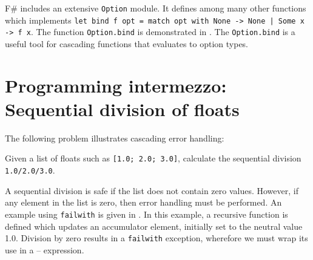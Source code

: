 F\# includes an extensive \lstinline{Option} module. It defines among many other functions  which implements \lstinline{let bind f opt = match opt with None -> None | Some x -> f x}. The function \lstinline{Option.bind} is demonstrated in .
%
%
The \lstinline{Option.bind} is a useful tool for cascading functions that evaluates to option types.

\section{Programming intermezzo: Sequential division of floats}
The following problem illustrates cascading error handling:
\begin{problem}
  Given a list of floats such as \lstinline{[1.0; 2.0; 3.0]}, calculate the sequential division \lstinline{1.0/2.0/3.0}. 
\end{problem}
A sequential division is safe if the list does not contain zero values. However, if any element in the list is zero, then error handling must be performed. An example using \lstinline{failwith} is given in .
%
%
In this example, a recursive function is defined which updates an accumulator element, initially set to the neutral value 1.0. Division by zero results in a \lstinline{failwith} exception, wherefore we must wrap its use in a -- expression.


